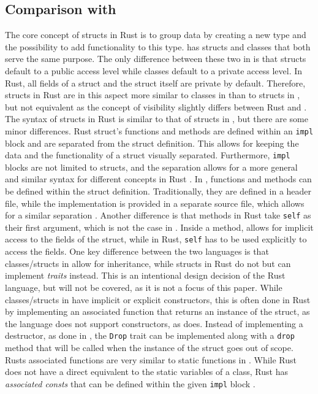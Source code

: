 \subsection{Comparison with \Cpp}
The core concept of structs in Rust is to group data by creating a new type and the possibility to add functionality to this type.
\Cpp has structs and classes that both serve the same purpose.
The only difference between these two in \Cpp is that structs default to a public access level while classes default to a private access level.
In Rust, all fields of a struct and the struct itself are private by default.
Therefore, structs in Rust are in this aspect more similar to classes in \Cpp than to structs in \Cpp, but not equivalent as the concept of visibility slightly differs between Rust and \Cpp  \cite[187]{Blandy_Jim2021-07-20}.
The syntax of structs in Rust is similar to that of structs in \Cpp, but there are some minor differences.
Rust struct's functions and methods are defined within an \texttt{impl} block and are separated from the struct definition.
This allows for keeping the data and the functionality of a struct visually separated.
Furthermore, \texttt{impl} blocks are not limited to structs, and the separation allows for a more general and similar syntax for different concepts in Rust \cite[220]{Blandy_Jim2021-07-20}.
In \Cpp, functions and methods can be defined within the struct definition.
Traditionally, they are defined in a header file, while the implementation is provided in a separate source file, which allows for a similar separation \cite[30-33]{Stroustrup_Bjarne2022-09-24}.
Another difference is that methods in Rust take \texttt{self} as their first argument, which is not the case in \Cpp.
Inside a method, \Cpp allows for implicit access to the fields of the struct, while in Rust, \texttt{self} has to be used explicitly to access the fields.
One key difference between the two languages is that classes/structs in \Cpp allow for inheritance, while structs in Rust do not but can implement \textit{traits} instead.
This is an intentional design decision of the Rust language, but will not be covered, as it is not a focus of this paper.
While classes/structs in \Cpp have implicit or explicit constructors, this is often done in Rust by implementing an associated function that returns an instance of the struct, as the language does not support constructors, as \Cpp does.
Instead of implementing a destructor, as done in \Cpp, the \texttt{Drop} trait can be implemented along with a \texttt{drop} method that will be called when the instance of the struct goes out of scope.
Rusts associated functions are very similar to static functions in \Cpp. While Rust does not have a direct equivalent to the static variables of a \Cpp class, Rust has \textit{associated consts} that can be defined within the given \texttt{impl} block \cite[220-221]{Blandy_Jim2021-07-20}.

